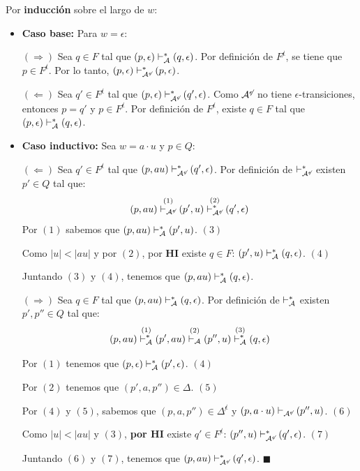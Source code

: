 Por \textbf{inducción} sobre el largo de $w$:
\begin{itemize}
    \item \textbf{Caso base:} Para $w = \epsilon$:

          $(\Rightarrow)$ Sea $q \in F$ tal que $(p, \epsilon) \vdash_{\mathcal{A}}^* (q, \epsilon)$. Por definición de $F^{\not\epsilon}$, se tiene que $p \in F^{\not\epsilon}$. Por lo tanto, $(p,\epsilon) \vdash_{\mathcal{A}^{\not\epsilon}}^* (p, \epsilon)$.

          $(\Leftarrow)$ Sea $q' \in F^{\not\epsilon}$ tal que $(p, \epsilon) \vdash_{\mathcal{A}^{\not\epsilon}}^* (q', \epsilon)$. Como $\mathcal{A}^{\not\epsilon}$ no tiene $\epsilon$-transiciones, entonces $p = q'$ y $p \in F^{\not\epsilon}$. Por definición de $F^{\not\epsilon}$, existe $q \in F$ tal que $(p, \epsilon) \vdash_{\mathcal{A}}^* (q, \epsilon)$.

    \item \textbf{Caso inductivo:} Sea $w = a\cdot u$ y $p \in Q$:

          $(\Leftarrow)$ Sea $q' \in F^{\not\epsilon}$ tal que $(p, au) \vdash_{\mathcal{A}^{\not\epsilon}}^* (q', \epsilon)$. Por definición de $\vdash_{\mathcal{A}^{\not\epsilon}}^*$ existen $p' \in Q$ tal que:
          $$
              (p, au) \overset{(1)}{\vdash_{\mathcal{A}^{\not\epsilon}}} (p', u) \overset{(2)}{\vdash_{\mathcal{A}^{\not\epsilon}}^*} (q', \epsilon)
          $$
          Por $(1)$ sabemos que $(p,au) \vdash_{\mathcal{A}}^* (p', u)$. \hfill $(3)$

          Como $|u| < |au|$ y por $(2)$, por \textbf{HI} existe $q \in F$: $(p', u) \vdash_{\mathcal{A}}^* (q, \epsilon)$. \hfill $(4)$

          Juntando $(3)$ y $(4)$, tenemos que $(p,au) \vdash_{\mathcal{A}}^* (q,\epsilon)$.

          $(\Rightarrow)$ Sea $q \in F$ tal que $(p,au) \vdash_{\mathcal{A}}^* (q, \epsilon)$. Por definición de $\vdash_{\mathcal{A}}^*$ existen $p',p'' \in Q$ tal que:
          $$
              (p, au) \overset{(1)}{\vdash_{\mathcal{A}}^*} (p', au) \overset{(2)}{\vdash_{\mathcal{A}}} (p'', u) \overset{(3)}{\vdash_{\mathcal{A}}^*} (q, \epsilon)
          $$

          Por $(1)$ tenemos que $(p, \epsilon) \vdash_{\mathcal{A}}^* (p', \epsilon)$. \hfill $(4)$

          Por $(2)$ tenemos que $(p', a, p'') \in \Delta.$ \hfill $(5)$

          Por $(4)$ y $(5)$, sabemos que $(p, a, p'') \in \Delta^{\not\epsilon}$ y $(p, a \cdot u) \vdash_{\mathcal{A}^{\not\epsilon}} (p'', u)$. \hfill $(6)$

          Como $|u| < |au|$ y $(3)$, \textbf{por HI} existe $q' \in F^{\not\epsilon}$: $(p'', u) \vdash_{\mathcal{A}^{\not\epsilon}}^* (q', \epsilon)$. \hfill $(7)$

          Juntando $(6)$ y $(7)$, tenemos que $(p, au) \vdash_{\mathcal{A}^{\not\epsilon}}^* (q', \epsilon)$. \hfill $\blacksquare$
\end{itemize}

